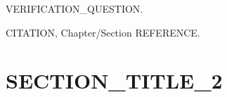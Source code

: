 \begin{checkpoint}
VERIFICATION_QUESTION.
\end{checkpoint}

\begin{refnote}
CITATION, Chapter/Section REFERENCE.
\end{refnote}

\section{SECTION\_TITLE\_2}
\label{sec:LABEL_sec2}


